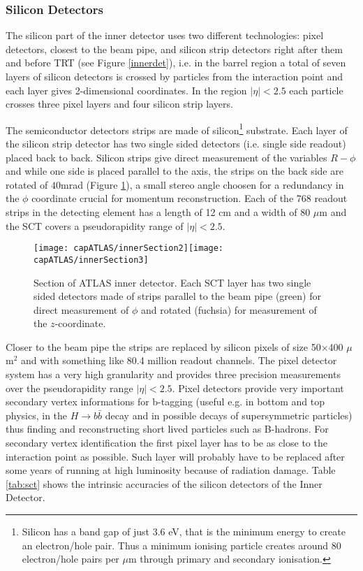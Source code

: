 \subsubsection{Silicon Detectors}
The silicon part  of the inner detector uses two different technologies: pixel detectors, closest to the beam pipe, and silicon strip detectors right after them and before TRT (see Figure \ref{innerdet}), i.e. in the barrel region a total of seven layers of silicon detectors is crossed by particles from the interaction point and each layer gives 2-dimensional coordinates. In the region $|\eta|<2.5$ each particle crosses three pixel layers and four silicon strip layers.

The semiconductor detectors strips are made of silicon\footnote{Silicon has a band gap of just 3.6 eV, that is the minimum energy to create an electron/hole pair. Thus a minimum ionising particle creates around 80 electron/hole pairs per $\mu$m through primary and secondary ionisation.} substrate. Each layer of the silicon strip detector has two single sided detectors (i.e. single side readout) placed back to back. Silicon strips give direct measurement of the variables $R-\phi$ and while one side is placed parallel to the axis, the strips on the back side are rotated of $40$mrad (Figure \ref{innersect2}), a small stereo angle choosen for a redundancy in the $\phi$ coordinate crucial for momentum reconstruction. Each of the 768 readout strips in the detecting element has a length of 12 cm and a width of 80 $\mu$m and the SCT covers a pseudorapidity range of $|\eta| < 2.5$.
\begin{figure}[htb]\begin{center}
\texttt{[image: capATLAS/innerSection2]}\hspace{0.5cm}\texttt{[image: capATLAS/innerSection3]}\caption{Section of ATLAS inner detector. Each SCT layer has two single sided detectors made of strips parallel to the beam pipe (green) for direct measurement of $\phi$ and rotated (fuchsia) for measurement of the $z$-coordinate.}\label{innersect2}
\end{center}\end{figure} 

Closer to the beam pipe the strips are replaced by silicon pixels of size 50$\times$400 $\mu$m$^{2}$ and with something like 80.4 million readout channels. The pixel detector system has a very high granularity and  provides three precision measurements over the pseudorapidity range $|\eta|<2.5$. Pixel detectors provide very important secondary vertex informations for b-tagging (useful e.g. in bottom and top physics, in the $H \rightarrow b\bar{b}$ decay and in possible decays of supersymmetric particles) thus finding and reconstructing short lived particles such as B-hadrons. For secondary vertex identification the first pixel layer has to be as close to the interaction point as possible. Such layer will probably have to be replaced after some years of running at high luminosity because of radiation damage. Table \ref{tab:sct} shows the intrinsic accuracies of the silicon detectors of the Inner Detector.



